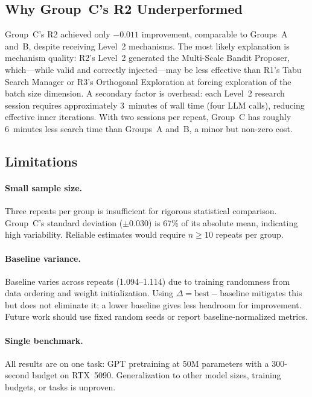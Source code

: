 \subsection{Why Group~C's R2 Underperformed}

Group~C's R2 achieved only $-0.011$ improvement, comparable to Groups~A and~B,
despite receiving Level~2 mechanisms.
The most likely explanation is mechanism quality: R2's Level~2 generated the
Multi-Scale Bandit Proposer, which---while valid and correctly injected---may
be less effective than R1's Tabu Search Manager or R3's Orthogonal Exploration
at forcing exploration of the batch size dimension.
A secondary factor is overhead: each Level~2 research session requires
approximately 3~minutes of wall time (four LLM calls), reducing effective inner
iterations.
With two sessions per repeat, Group~C has roughly 6~minutes less search time
than Groups~A and~B, a minor but non-zero cost.

\subsection{Limitations}

\paragraph{Small sample size.}
Three repeats per group is insufficient for rigorous statistical comparison.
Group~C's standard deviation ($\pm 0.030$) is 67\% of its absolute mean, indicating
high variability.
Reliable estimates would require $n \geq 10$ repeats per group.

\paragraph{Baseline variance.}
Baseline \valbpb{} varies across repeats (1.094--1.114) due to training
randomness from data ordering and weight initialization.
Using $\Delta = \text{best} - \text{baseline}$ mitigates this but does not
eliminate it; a lower baseline gives less headroom for improvement.
Future work should use fixed random seeds or report baseline-normalized metrics.

\paragraph{Single benchmark.}
All results are on one task: GPT pretraining at 50M parameters with a 300-second
budget on RTX~5090.
Generalization to other model sizes, training budgets, or tasks is unproven.

